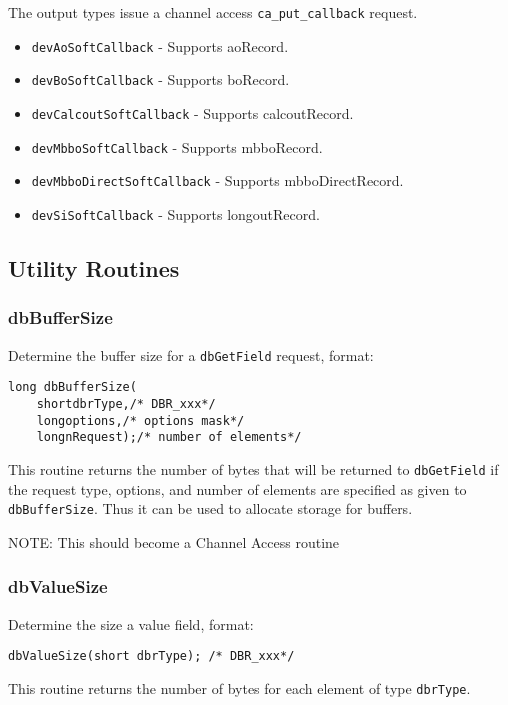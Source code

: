 The output types issue a channel access \verb|ca_put_callback| request.
\begin{itemize}
\item \verb|devAoSoftCallback| - Supports aoRecord.
\item \verb|devBoSoftCallback| - Supports boRecord.
\item \verb|devCalcoutSoftCallback| - Supports calcoutRecord.
\item \verb|devMbboSoftCallback| - Supports mbboRecord.
\item \verb|devMbboDirectSoftCallback| - Supports mbboDirectRecord.
\item \verb|devSiSoftCallback| - Supports longoutRecord.
\end{itemize}


\subsection{Utility Routines}

\subsubsection{dbBufferSize}

Determine the buffer size for a \verb|dbGetField| request, format:

\begin{verbatim}
long dbBufferSize(
    shortdbrType,/* DBR_xxx*/
    longoptions,/* options mask*/
    longnRequest);/* number of elements*/
\end{verbatim}

This routine returns the number of bytes that will be returned to \verb|dbGetField| if the request type, options, and number of 
elements are specified as given to \verb|dbBufferSize|. Thus it can be used to allocate storage for buffers.

NOTE: This should become a Channel Access routine

\subsubsection{dbValueSize}

Determine the size a value field, format:

\begin{verbatim}
dbValueSize(short dbrType); /* DBR_xxx*/
\end{verbatim}

This routine returns the number of bytes for each element of type \verb|dbrType|.

